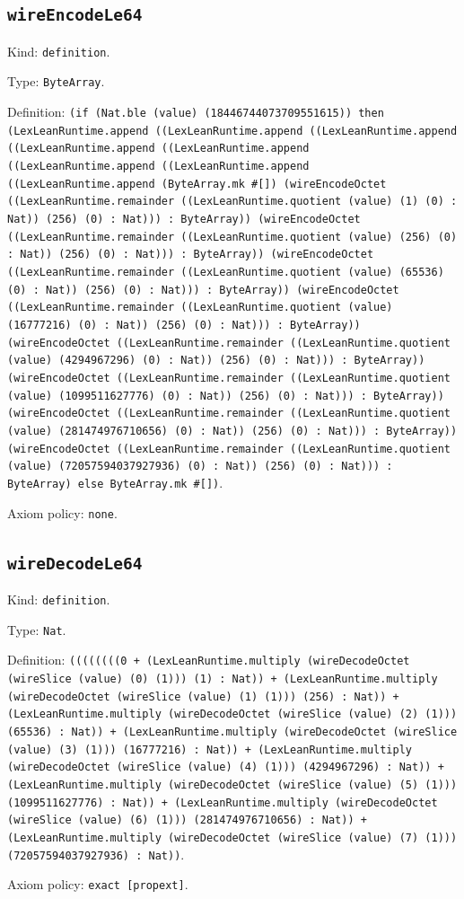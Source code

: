 \documentclass[11pt]{article}
\begin{document}
\subsection*{\texttt{wireEncodeLe64}}
\noindent Kind: \texttt{definition}.\par
\noindent Type: \texttt{ByteArray}.\par
\noindent Definition: \texttt{(if (Nat.ble (value) (18446744073709551615)) then (LexLeanRuntime.append ((LexLeanRuntime.append ((LexLeanRuntime.append ((LexLeanRuntime.append ((LexLeanRuntime.append ((LexLeanRuntime.append ((LexLeanRuntime.append ((LexLeanRuntime.append (ByteArray.mk \#[]) (wireEncodeOctet ((LexLeanRuntime.remainder ((LexLeanRuntime.quotient (value) (1) (0) : Nat)) (256) (0) : Nat))) : ByteArray)) (wireEncodeOctet ((LexLeanRuntime.remainder ((LexLeanRuntime.quotient (value) (256) (0) : Nat)) (256) (0) : Nat))) : ByteArray)) (wireEncodeOctet ((LexLeanRuntime.remainder ((LexLeanRuntime.quotient (value) (65536) (0) : Nat)) (256) (0) : Nat))) : ByteArray)) (wireEncodeOctet ((LexLeanRuntime.remainder ((LexLeanRuntime.quotient (value) (16777216) (0) : Nat)) (256) (0) : Nat))) : ByteArray)) (wireEncodeOctet ((LexLeanRuntime.remainder ((LexLeanRuntime.quotient (value) (4294967296) (0) : Nat)) (256) (0) : Nat))) : ByteArray)) (wireEncodeOctet ((LexLeanRuntime.remainder ((LexLeanRuntime.quotient (value) (1099511627776) (0) : Nat)) (256) (0) : Nat))) : ByteArray)) (wireEncodeOctet ((LexLeanRuntime.remainder ((LexLeanRuntime.quotient (value) (281474976710656) (0) : Nat)) (256) (0) : Nat))) : ByteArray)) (wireEncodeOctet ((LexLeanRuntime.remainder ((LexLeanRuntime.quotient (value) (72057594037927936) (0) : Nat)) (256) (0) : Nat))) : ByteArray) else ByteArray.mk \#[])}.\par
\noindent Axiom policy: \texttt{none}.\par
\subsection*{\texttt{wireDecodeLe64}}
\noindent Kind: \texttt{definition}.\par
\noindent Type: \texttt{Nat}.\par
\noindent Definition: \texttt{((((((((0 + (LexLeanRuntime.multiply (wireDecodeOctet (wireSlice (value) (0) (1))) (1) : Nat)) + (LexLeanRuntime.multiply (wireDecodeOctet (wireSlice (value) (1) (1))) (256) : Nat)) + (LexLeanRuntime.multiply (wireDecodeOctet (wireSlice (value) (2) (1))) (65536) : Nat)) + (LexLeanRuntime.multiply (wireDecodeOctet (wireSlice (value) (3) (1))) (16777216) : Nat)) + (LexLeanRuntime.multiply (wireDecodeOctet (wireSlice (value) (4) (1))) (4294967296) : Nat)) + (LexLeanRuntime.multiply (wireDecodeOctet (wireSlice (value) (5) (1))) (1099511627776) : Nat)) + (LexLeanRuntime.multiply (wireDecodeOctet (wireSlice (value) (6) (1))) (281474976710656) : Nat)) + (LexLeanRuntime.multiply (wireDecodeOctet (wireSlice (value) (7) (1))) (72057594037927936) : Nat))}.\par
\noindent Axiom policy: \texttt{exact [propext]}.\par
\end{document}
